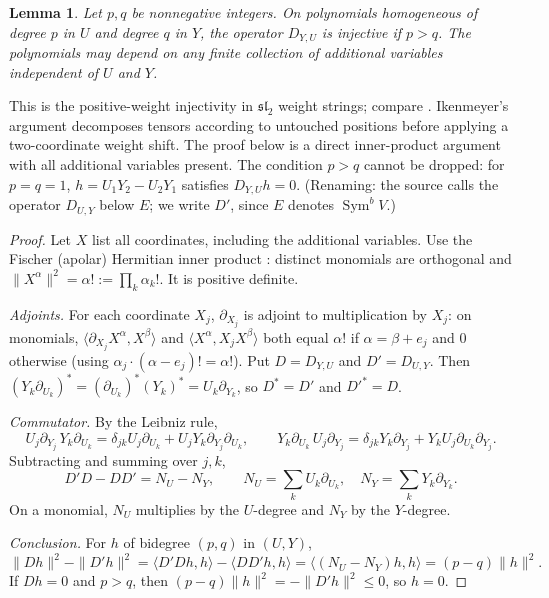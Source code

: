 \documentclass[11pt]{article}
\newtheorem{lemma}[theorem]{Lemma}
\theoremstyle{remark}
\DeclareMathOperator{\Sym}{Sym}
\newcommand{\D}[2]{D_{#1,#2}}
\begin{document}
\begin{lemma}\label{lem:shift}
Let $p,q$ be nonnegative integers. On polynomials homogeneous of degree $p$
in $U$ and degree $q$ in $Y$, the operator $\D{Y}{U}$ is injective if
$p>q$. The polynomials may depend on any finite collection of additional
variables independent of $U$ and $Y$.
\end{lemma}

This is the positive-weight injectivity in $\mathfrak{sl}_2$ weight strings;
compare \cite[Section~11.1, Claim~11.4 and equation~(11.5)]{FultonHarris}.
Ikenmeyer's argument \cite[Section~5, Claim~5.1]{Ikenmeyer} decomposes
tensors according to untouched positions before applying a two-coordinate
weight shift. The proof below is a direct inner-product argument with all
additional variables present. The condition $p>q$ cannot be dropped: for
$p=q=1$, $h=U_1Y_2-U_2Y_1$ satisfies $\D{Y}{U}h=0$. (Renaming: the source
calls the operator $\D{U}{Y}$ below $E$; we write $D'$, since $E$ denotes
$\Sym^bV$.)

\begin{proof}
Let $X$ list all coordinates, including the additional variables. Use the
Fischer (apolar) Hermitian inner product
\cite[Section~2, equation~(8) and Proposition~3]{AldazRender}: distinct
monomials are orthogonal and
$\|X^\alpha\|^2=\alpha!:=\prod_k\alpha_k!$. It is positive definite.

\emph{Adjoints.} For each coordinate $X_j$, $\partial_{X_j}$ is adjoint to
multiplication by $X_j$: on monomials,
$\langle\partial_{X_j}X^\alpha,X^\beta\rangle$ and
$\langle X^\alpha,X_jX^\beta\rangle$ both equal $\alpha!$ if
$\alpha=\beta+e_j$ and $0$ otherwise (using
$\alpha_j\cdot(\alpha-e_j)!=\alpha!$). Put $D=\D{Y}{U}$ and $D'=\D{U}{Y}$.
Then $(Y_k\partial_{U_k})^*=(\partial_{U_k})^*(Y_k)^*=U_k\partial_{Y_k}$, so
$D^*=D'$ and $D'^*=D$.

\emph{Commutator.} By the Leibniz rule,
\[
 U_j\partial_{Y_j}\,Y_k\partial_{U_k}
 =\delta_{jk}U_j\partial_{U_k}+U_jY_k\partial_{Y_j}\partial_{U_k},
 \qquad
 Y_k\partial_{U_k}\,U_j\partial_{Y_j}
 =\delta_{jk}Y_k\partial_{Y_j}+Y_kU_j\partial_{U_k}\partial_{Y_j}.
\]
Subtracting and summing over $j,k$,
\[
 D'D-DD'=N_U-N_Y,
 \qquad
 N_U=\sum_k U_k\partial_{U_k},\quad
 N_Y=\sum_k Y_k\partial_{Y_k}.
\]
On a monomial, $N_U$ multiplies by the $U$-degree and $N_Y$ by the
$Y$-degree.

\emph{Conclusion.} For $h$ of bidegree $(p,q)$ in $(U,Y)$,
\begin{equation}\label{eq:norm}
 \|Dh\|^2-\|D'h\|^2
 =\langle D'Dh,h\rangle-\langle DD'h,h\rangle
 =\langle(N_U-N_Y)h,h\rangle=(p-q)\|h\|^2.
\end{equation}
If $Dh=0$ and $p>q$, then $(p-q)\|h\|^2=-\|D'h\|^2\le0$, so $h=0$.
\end{proof}
\end{document}
